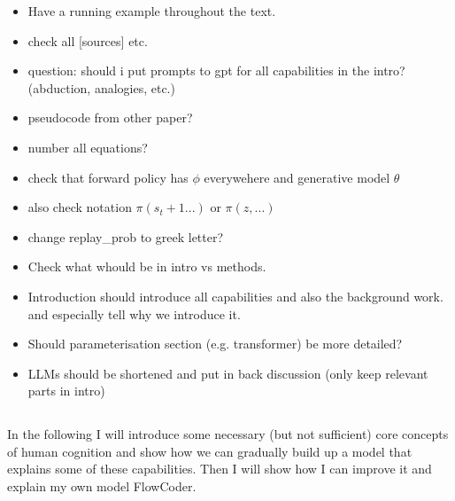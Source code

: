 \begin{itemize}
    \item Have a running example throughout the text.
    \item check all [sources] etc.
    \item question: should i put prompts to gpt for all capabilities in the intro? (abduction, analogies, etc.)
    \item pseudocode from other paper?
    \item number all equations?
    \item check that forward policy has $\phi$ everywehere and generative model $\theta$
    \item also check notation $\pi(s_t+1 ...)$ or $\pi(z,...)$
    \item change replay\_prob to greek letter?
    \item Check what whould be in intro vs methods. 
    \item Introduction should introduce all capabilities and also the background work. and especially tell why we introduce it.
    \item Should parameterisation section (e.g. transformer) be more detailed?
    \item LLMs should be shortened and put in back discussion (only keep relevant parts in intro)
\end{itemize}


















\subsection{}
In the following I will introduce some necessary (but not sufficient) core concepts of human cognition and show how we can gradually build up a model that explains some of these capabilities. Then I will show how I can improve it and explain my own model FlowCoder.

\subsubsection{}

